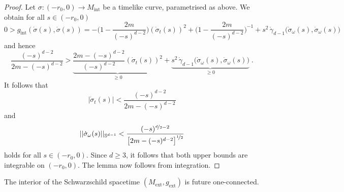 \documentclass[reqno]{article}
\newcommand{\Sd}{\mathbb{S}^{d-1}}
\newcommand{\Mint}{M_{\mathrm{int}}}
\newcommand{\gint}{g_{\mathrm{int}}}
\newcommand{\Mext}{M_{\mathrm{ext}}}
\newcommand{\gext}{g_{\mathrm{ext}}}
\begin{document}
\begin{proof}
Let $\sigma : (-r_0,0) \to \Mint$ be a timelike curve, parametrised as above. We obtain for all $s \in (-r_0,0)$
\begin{equation*}
0 > \gint(\dot{\sigma}(s),\dot{\sigma}(s)) = -\big(1- \frac{2m}{(-s)^{d-2}}\big) (\dot{\sigma}_t(s))^2 + \big(1- \frac{2m}{(-s)^{d-2}}\big)^{-1} + s^2 \, \mathring{\gamma}_{d-1}\big(\dot{\sigma}_{\omega}(s), \dot{\sigma}_{\omega}(s)\big) 
\end{equation*}
and hence
\begin{equation*}
\frac{(-s)^{d-2}}{2m - (-s)^{d-2}}  >  \underbrace{\frac{2m - (-s)^{d-2}}{(-s)^{d-2}} (\dot{\sigma}_t(s))^2}_{\geq 0}  + \underbrace{ s^2 \, \mathring{\gamma}_{d-1}\big(\dot{\sigma}_{\omega}(s), \dot{\sigma}_{\omega}(s)\big)}_{\geq 0} \;.
\end{equation*}
It follows that
\begin{equation}
\label{BoundTVel}
|\dot{\sigma}_t(s)| < \frac{(-s)^{d-2}}{2m - (-s)^{d-2}} 
\end{equation}
and
\begin{equation}
\label{BoundAngVel}
||\dot{\sigma}_\omega(s)||_{\Sd} < \frac{(-s)^{\nicefrac{d}{2} - 2}}{\big[2m - (-s)^{d-2}\big]^{\nicefrac{1}{2}}}
\end{equation}
holds for all $s \in (-r_0,0)$. Since $d \geq 3$, it follows that both upper bounds are integrable on $(-r_0,0)$. The lemma now follows from integration.
\end{proof}



\begin{proposition}\label{schwprop:IntFutCon}
\label{IntFutCon}
The interior of the Schwarzschild spacetime $(\Mext, \gext)$ is future one-connected.
\end{proposition}
\end{document}
